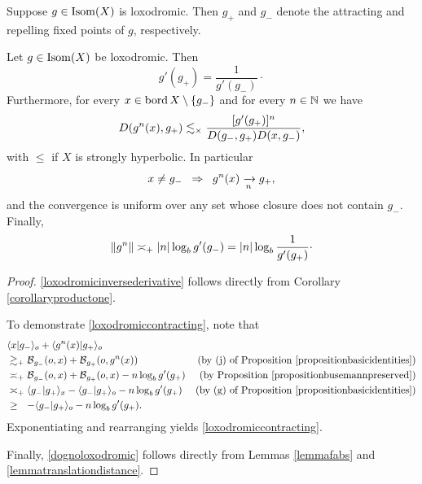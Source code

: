 \begin{notation}
Suppose $g\in\operatorname{Isom}(X)$ is loxodromic. Then $g_+$ and $g_-$ denote the attracting and repelling fixed points of $g$, respectively.
\end{notation}

\begin{theorem}
\label{theoremloxodromicextra}
Let $g\in\operatorname{Isom}(X)$ be loxodromic. Then
\begin{equation}
\label{loxodromicinversederivative}
g'(g_+) = \frac{1}{g'(g_-)}\cdot
\end{equation}
Furthermore, for every $x\in \operatorname{bord} X\setminus\{g_-\}$ and for every $n\in\N$ we have
\begin{equation}
\label{loxodromiccontracting}
D(g^n(x), g_+) \lesssim_\times \frac{[g'(g_+)]^n}{D(g_-,g_+)D(x, g_-)},
\end{equation}
with $\leq$ if $X$ is strongly hyperbolic. In particular
\[
x\neq g_- \;\;\Rightarrow\;\; g^n(x)\xrightarrow[n]{} g_+,
\]
and the convergence is uniform over any set whose closure does not contain $g_-$. Finally,
\begin{equation}
\label{dognoloxodromic}
\|g^n\| \asymp_+ |n| \log_b g'(g_-) = |n| \log_b \frac{1}{g'(g_+)}\cdot
\end{equation}
\end{theorem}
\begin{proof}
\eqref{loxodromicinversederivative} follows directly from Corollary \ref{corollaryproductone}.

To demonstrate \eqref{loxodromiccontracting}, note that
\begin{align*}
&\lb x|g_-\rb_\zero + \lb g^n(x)|g_+\rb_\zero\\
&\gtrsim_\plus \busemann_{g_-}(\zero,x) + \busemann_{g_+}(\zero,g^n(x)) \by{(j) of Proposition \ref{propositionbasicidentities}}\\
&\asymp_\plus \busemann_{g_-}(\zero,x) + \busemann_{g_+}(\zero,x) - n \log_b g'(g_+) \by{Proposition \ref{propositionbusemannpreserved}}\\
&\asymp_\plus \lb g_-|g_+\rb_x - \lb g_-|g_+\rb_\zero - n \log_b g'(g_+) \by{(g) of Proposition \ref{propositionbasicidentities}}\\
&\geq_\pt -\lb g_-|g_+\rb_\zero - n\log_b g'(g_+).
\end{align*}
Exponentiating and rearranging yields \eqref{loxodromiccontracting}.

Finally, \eqref{dognoloxodromic} follows directly from Lemmas \ref{lemmafabs} and \ref{lemmatranslationdistance}.
\end{proof}

